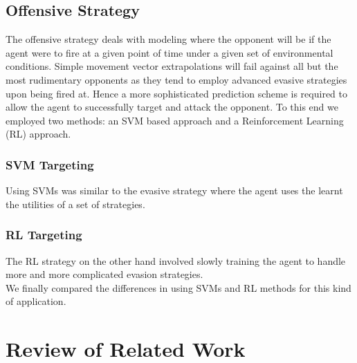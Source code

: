 \documentclass{article}
\theoremstyle{plain}
\theoremstyle{definition}
\theoremstyle{remark}
\begin{document}
\subsection*{Offensive Strategy}
The offensive strategy deals with modeling where the opponent will be if the agent were to fire at a given point of time under a given set of environmental conditions. Simple movement vector extrapolations will fail against all but the most rudimentary opponents as they tend to employ advanced evasive strategies upon being fired at. Hence a more sophisticated prediction scheme is required to allow the agent to successfully target and attack the opponent. To this end we employed two methods: an SVM based approach and a Reinforcement Learning (RL) approach. 

\subsubsection*{SVM Targeting}
Using SVMs was similar to the evasive strategy where the agent uses the learnt the utilities of a set of strategies.

\subsubsection*{RL Targeting}

The RL strategy on the other hand involved slowly training the agent to handle more and more complicated evasion strategies.\\


 We finally compared the differences in using SVMs and RL methods for this kind of application.

 
\section{Review of Related Work}
\end{document}
